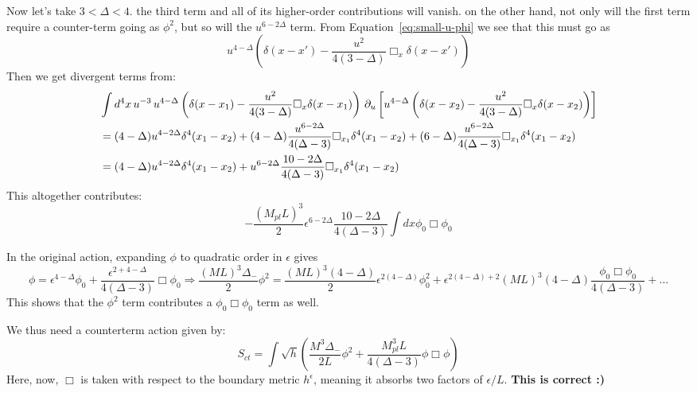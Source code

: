 \documentclass[11pt, class=article, crop=false]{standalone}
\begin{document}
\begin{enumerate}
	Now let's take $3 < \Delta < 4$. the third term and all of its higher-order contributions will vanish. on the other hand, not only will the first term require a counter-term going as $\phi^2$, but so will the $u^{6-2 \Delta}$ term. From Equation~\eqref{eq:small-u-phi} we see that this must go as 
	\[
		u^{4-\Delta}(\delta(x-x') - \frac{u^2}{4 (3- \Delta)} \Box_x \delta(x- x') )
	\]
	Then we get divergent terms from:
	\[
	\begin{aligned}
		&\int d^4 x \, u^{-3} \, u^{4-\Delta}\left(\delta(x-x_1) - \frac{u^2}{4 (3- \Delta)} \Box_x \delta(x- x_1) \right) \, \partial_u \left[
		u^{4-\Delta} \left(\delta(x-x_2) - \frac{u^2}{4 (3- \Delta)} \Box_x \delta(x- x_2) \right) \right]\\
		&= (4-\Delta) u^{4-2\Delta} \delta^4 (x_1 - x_2) + (4-\Delta) \frac{u^{6-2\Delta}}{4 (\Delta-3)} \Box_{x_1} \delta^4 (x_1 - x_2) + (6-\Delta) \frac{u^{6-2\Delta}}{4 (\Delta-3)} \Box_{x_1} \delta^4 (x_1 - x_2)\\
		&= (4-\Delta) u^{4-2\Delta} \delta^4 (x_1 - x_2) +  u^{6-2\Delta} \frac{10-2\Delta}{4 (\Delta-3)} \Box_{x_1} \delta^4 (x_1 - x_2)
	\end{aligned}
	\]
	This altogether contributes:
	\[
		- \frac{(M_{pl} L)^3}{2} \epsilon^{6-2\Delta} \frac{10-2\Delta}{4 (\Delta-3)} \int dx \phi_0 \Box \phi_0
	\]
	
	In the original action, expanding $\phi$ to quadratic order in $\epsilon$ gives
	\[
		\phi = \epsilon^{4-\Delta} \phi_0 + \frac{\epsilon^{2 + 4 - \Delta}}{4 (\Delta - 3)} \Box \phi_0 \Rightarrow \frac{(ML)^3 \Delta_{-}}{2} \phi^2 =   \frac{(ML)^3 (4- \Delta)}{2} \epsilon^{2 (4- \Delta)} \phi_0^2  + \epsilon^{2 (4 - \Delta) + 2} (ML)^3 (4-\Delta) \frac{\phi_0 \Box \phi_0}{4 (\Delta - 3)} + \dots
	\]
	This shows that the $\phi^2$ term contributes a $\phi_0 \Box \phi_0$ term as well. 
	
	We thus need a counterterm action given by:
	\[
		S_{ct} = \int \sqrt{h} \left( \frac{M^3 \Delta_-}{2L} \phi^2 + \frac{M_{pl}^3 L}{4 (\Delta - 3)} \phi \Box \phi \right)%
	\]
	Here, now, $\Box$ is taken with respect to the boundary metric $h^\epsilon$, meaning it absorbs two factors of $\epsilon/L$. \textbf{This is correct :)}
	

\end{enumerate}
\end{document}

